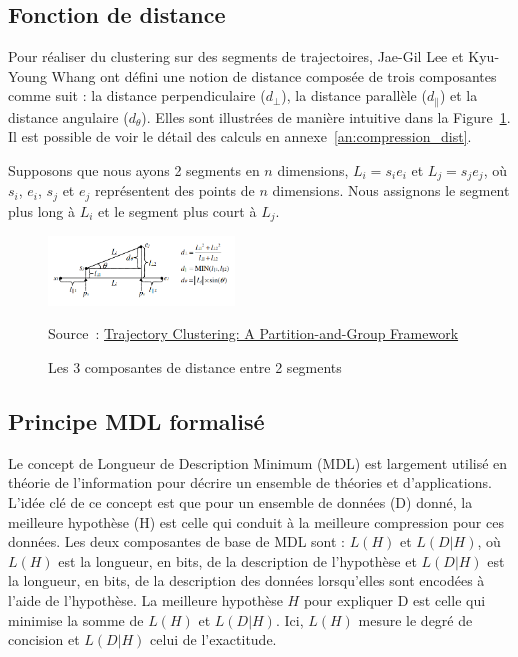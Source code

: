 \subsection{Fonction de distance}

Pour réaliser du clustering sur des segments de trajectoires, Jae-Gil Lee et Kyu-Young Whang ont défini une notion de distance composée de trois composantes comme suit : la distance perpendiculaire ($d_{\perp}$), la distance parallèle ($d_{\parallel}$) et la distance angulaire ($d_{\theta}$). Elles sont illustrées de manière intuitive dans la Figure~\ref{fig:distances}. Il est possible de voir le détail des calculs en annexe~\ref{an:compression_dist}.

Supposons que nous ayons 2 segments en $n$ dimensions, $L_i = s_i e_i$ et $L_j = s_j e_j$, où $s_i$, $e_i$, $s_j$ et $e_j$ représentent des points de $n$ dimensions. Nous assignons le segment plus long à $L_i$ et le segment plus court à $L_j$.


\begin{figure}[ht]
    \centering
    \includegraphics[width=0.44\textwidth]{Images/distances.png}
    \caption{Les 3 composantes de distance entre 2 segments}
    \label{fig:distances}
    Source : \href{https://hanj.cs.illinois.edu/pdf/sigmod07_jglee.pdf}{Trajectory Clustering: A Partition-and-Group Framework}
\end{figure}


\subsection{Principe MDL formalisé}

Le concept de Longueur de Description Minimum (MDL) est largement utilisé en théorie de l'information pour décrire un ensemble de théories et d'applications. L'idée clé de ce concept est que pour un ensemble de données (D) donné, la meilleure hypothèse (H) est celle qui conduit à la meilleure compression pour ces données. Les deux composantes de base de MDL sont : $L(H)$ et $L(D|H)$, où $L(H)$ est la longueur, en bits, de la description de l'hypothèse et $L(D|H)$ est la longueur, en bits, de la description des données lorsqu'elles sont encodées à l'aide de l'hypothèse. La meilleure hypothèse $H$ pour expliquer D est celle qui minimise la somme de $L(H)$ et $L(D|H)$. Ici, $L(H)$ mesure le degré de concision et $L(D|H)$ celui de l'exactitude.


